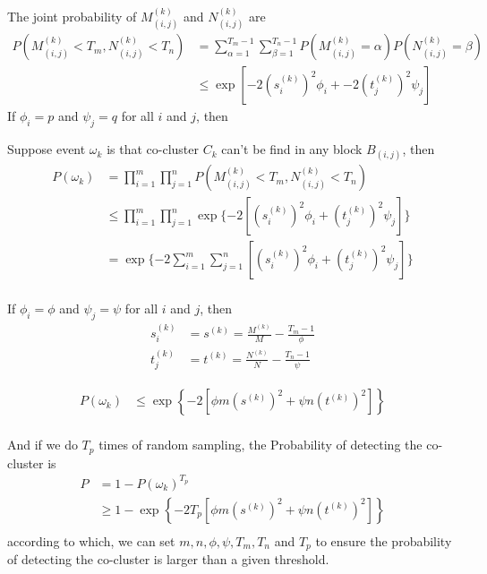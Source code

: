 \documentclass[12pt]{article}
\begin{document}
The joint probability of $M_{(i,j)}^{(k)}$ and $N_{(i,j)}^{(k)}$ are
\begin{align*}
    P(M_{(i,j)}^{(k)} < T_m, N_{(i,j)}^{(k)} < T_n) & = \sum_{\alpha=1}^{T_m-1} \sum_{\beta=1}^{T_n-1} P(M_{(i,j)}^{(k)} = \alpha) P(N_{(i,j)}^{(k)} = \beta) \\
                                                    & \le \exp[-2 (s_i^{(k)})^2 \phi_i + -2 (t_j^{(k)})^2 \psi_j]
\end{align*}
If $\phi_i = p$ and $\psi_j = q$ for all $i$ and $j$, then

Suppose event $\omega_k$ is that co-cluster $C_k$ can't be find in any block $B_{(i,j)}$, then
\begin{align*}
    P(\omega_k) & = \prod_{i=1}^m \prod_{j=1}^n P(M_{(i,j)}^{(k)} < T_m, N_{(i,j)}^{(k)} < T_n)                          \\
                & \le \prod_{i=1}^m \prod_{j=1}^n \exp\{-2 \left[ (s_i^{(k)})^2 \phi_i + (t_j^{(k)})^2 \psi_j \right] \} \\
                & = \exp\{-2 \sum_{i=1}^m \sum_{j=1}^n \left[ (s_i^{(k)})^2 \phi_i + (t_j^{(k)})^2 \psi_j \right] \}     \\
\end{align*}

If $\phi_i = \phi$ and $\psi_j = \psi$ for all $i$ and $j$, then
\begin{align*}
    s_i^{(k)} & = s^{(k)} = \frac{M^{(k)}}{M}-\frac{T_m-1}{\phi} \\
    t_j^{(k)} & = t^{(k)} = \frac{N^{(k)}}{N}-\frac{T_n-1}{\psi}
\end{align*}

\begin{align*}
    P(\omega_k) & \le \exp \left\{ -2 [\phi m (s^{(k)})^2 + \psi n (t^{(k)})^2] \right\} \\
\end{align*}


And if we do $T_p$ times of random sampling, the Probability of detecting the co-cluster is
\begin{align*}
    P & = 1 - P(\omega_k)^{T_p}                                                        \\
      & \ge 1 - \exp \left\{ -2 T_p [\phi m (s^{(k)})^2 + \psi n (t^{(k)})^2] \right\} \\
\end{align*}
according to which, we can set $m, n, \phi, \psi, T_m, T_n$ and $T_p$ to ensure the probability of detecting the co-cluster is larger than a given threshold.
\end{document}
